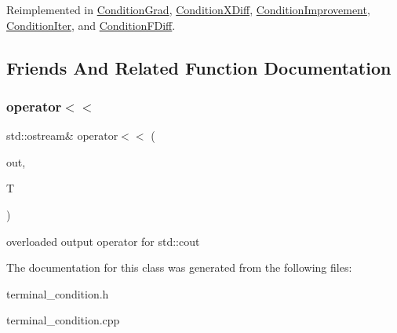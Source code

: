 Reimplemented in \hyperlink{class_condition_grad_a28d97a0d0291b24976d4499b904190a7}{Condition\+Grad}, \hyperlink{class_condition_x_diff_a375e80eb4b88db5c2823a7d4efe20972}{Condition\+X\+Diff}, \hyperlink{class_condition_improvement_a012d8db22fd6fcf8a71ab0fb5ecc1940}{Condition\+Improvement}, \hyperlink{class_condition_iter_af9de25d536e5a9af7bd711e569356533}{Condition\+Iter}, and \hyperlink{class_condition_f_diff_a31b06f62d08ab7c2ec1b011148889aab}{Condition\+F\+Diff}.



\subsection{Friends And Related Function Documentation}
\mbox{\label{class_terminal_condition_a734331dfe86aa4863287602132c3ce97}} 
\subsubsection{\texorpdfstring{operator$<$$<$}{operator<<}}
{\footnotesize\ttfamily std\+::ostream\& operator$<$$<$ (\begin{DoxyParamCaption}\item[{std\+::ostream \&}]{out,  }\item[{std\+::shared\+\_\+ptr$<$ \hyperlink{class_terminal_condition}{Terminal\+Condition} $>$}]{T }\end{DoxyParamCaption})\hspace{0.3cm}{\ttfamily [friend]}}

overloaded output operator for std\+::cout 

The documentation for this class was generated from the following files\+:\begin{DoxyCompactItemize}
\item 
terminal\+\_\+condition.\+h\item 
terminal\+\_\+condition.\+cpp\end{DoxyCompactItemize}
